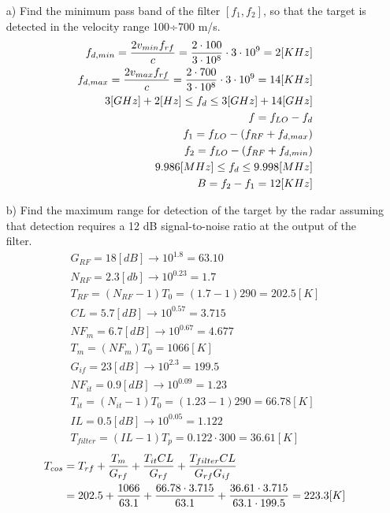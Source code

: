 \documentclass[12pt, letterpaper]{article}
\begin{document}
\begin{itemize}
  \item [a)] Find the minimum pass band of the filter $[f_1, f_2]$, so that the target is detected in the velocity range 100÷700 m/s.
  \begin{align*}
    f_{d,min}
    =
    {2v_{min}f_{rf}\over c}
    =
    {2\cdot100\over3\cdot10^8}\cdot 3\cdot10^9
    =
    2[KHz]
    \\
    f_{d,max}
    =
    {2v_{max}f_{rf}\over c}
    =
    {2\cdot700\over3\cdot10^8}\cdot 3\cdot10^9
    =
    14[KHz]
    \\
    3[GHz]+2[Hz]\le f_d \le 3[GHz]+14[GHz]
    \\
    f=f_{LO}-f_d
    \\
    f_1=f_{LO}-(f_{RF}+f_{d,max})
    \\
    f_2=f_{LO}-(f_{RF}+f_{d,min})
    \\
    9.986[MHz]\le f_d \le 9.998[MHz]
    \\
    B=f_2-f_1=12[KHz]
  \end{align*}
  \item [b)] Find the maximum range for detection of the target by the radar assuming that detection requires a 12 dB signal-to-noise ratio at the output of the filter.
  \begin{align*}
    G_{RF}=18[dB]\rightarrow10^{1.8}=63.10
    \\
    N_{RF}=2.3[db]\rightarrow10^{0.23}=1.7
    \\
    T_{RF}=(N_{RF}-1)T_0=(1.7-1)290=202.5[K]
    \\
    CL=5.7[dB]\rightarrow10^{0.57}=3.715
    \\
    NF_m=6.7[dB]\rightarrow10^{0.67}=4.677
    \\
    T_m=(NF_m)T_0=1066[K]
    \\
    G_{if}=23[dB]\rightarrow10^{2.3}=199.5
    \\
    NF_{it}=0.9[dB]\rightarrow10^{0.09}=1.23
    \\
    T_{it}=(N_{it}-1)T_0=(1.23-1)290=66.78[K]
    \\
    IL=0.5[dB]\rightarrow10^{0.05}=1.122
    \\
    T_{filter}=(IL-1)T_p=0.122\cdot300=36.61[K]
  \end{align*}
  \begin{align*}
    T_{cos}
    &=
    T_{rf}+{T_m\over G_{rf}}+{T_{it}CL\over G_{rf}}+{T_{filter}CL\over G_{rf}G_{if}}
    \\
    &=202.5+{1066\over63.1}+{66.78\cdot3.715\over63.1}+{36.61\cdot3.715\over63.1\cdot199.5}=223.3[K]

\end{align*}
\end{itemize}
\end{document}

